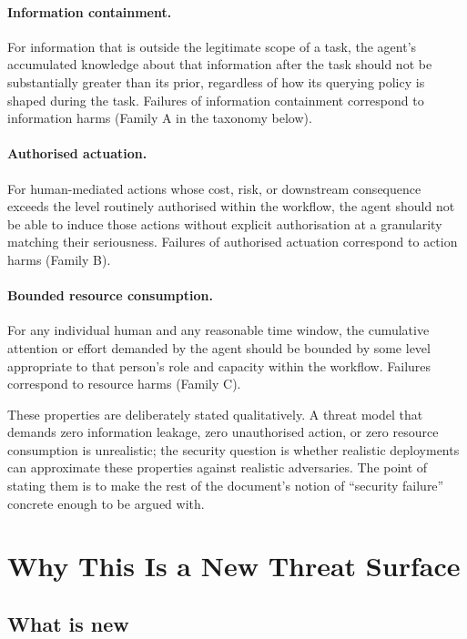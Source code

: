\documentclass[11pt]{article}
\begin{document}
\paragraph{Information containment.} For information that is outside the legitimate scope of a task, the agent's accumulated knowledge about that information after the task should not be substantially greater than its prior, regardless of how its querying policy is shaped during the task. Failures of information containment correspond to information harms (Family A in the taxonomy below).

\paragraph{Authorised actuation.} For human-mediated actions whose cost, risk, or downstream consequence exceeds the level routinely authorised within the workflow, the agent should not be able to induce those actions without explicit authorisation at a granularity matching their seriousness. Failures of authorised actuation correspond to action harms (Family B).

\paragraph{Bounded resource consumption.} For any individual human and any reasonable time window, the cumulative attention or effort demanded by the agent should be bounded by some level appropriate to that person's role and capacity within the workflow. Failures correspond to resource harms (Family C).

These properties are deliberately stated qualitatively. A threat model that demands zero information leakage, zero unauthorised action, or zero resource consumption is unrealistic; the security question is whether realistic deployments can approximate these properties against realistic adversaries. The point of stating them is to make the rest of the document's notion of ``security failure'' concrete enough to be argued with.

\section{Why This Is a New Threat Surface}

\subsection{What is new}
\end{document}
